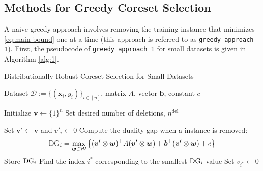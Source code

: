 \subsection{Methods for Greedy Coreset Selection} \label{app:algorithm}

%
A naive greedy approach involves removing the training instance that minimizes \eqref{eq:main-bound} one at a time (this approach is referred to as {\tt greedy approach 1}).
%
First, the pseudocode of {\tt greedy approach 1} for small datasets is given in Algorithm \ref{alg:1}.
%
\begin{algorithm}[H]
  \renewcommand{\algorithmicrequire}{\textbf{Input:}}
  \renewcommand{\algorithmicensure}{\textbf{Output:}}
  \caption{Distributionally Robust Coreset Selection for Small Datasets}
  \label{alg:1}
  \begin{algorithmic}[1]
      \Require Dataset ${\mathcal D} := \{(\bm x_i, y_i)\}_{i \in [n]}$, matrix $A$, vector $\bm b$, constant $c$

      \State Initialize $\boldsymbol{v} \gets \{1\}^n$
      \State Set desired number of deletions, $n^\mathrm{del}$

              \State Set $\boldsymbol{v'} \gets \boldsymbol{v}$ and $v'_i \gets 0$ 
              \State Compute the duality gap when a instance is removed:
              \[
              {\rm DG}_i = \max_{\boldsymbol{w} \in \mathcal{W}} \left\{(\boldsymbol{v'} \otimes \boldsymbol{w})^\top A (\boldsymbol{v'} \otimes \boldsymbol{w}) + \bm b^\top (\boldsymbol{v'} \otimes \boldsymbol{w}) + c \right\}
              \]
              \State Store ${\rm DG}_i$
          \EndFor
          \State Find the index $i^*$ corresponding to the smallest ${\rm DG}_i$ value
          \State Set $v_{i^*} \gets 0$ 


\end{algorithmic}
\end{algorithm}

